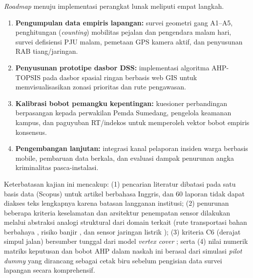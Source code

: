 \documentclass[10pt,twocolumn,a4paper]{article}
\begin{document}
\textit{Roadmap} menuju implementasi perangkat lunak meliputi empat langkah.
\begin{enumerate}[label=\arabic*)]
\item \textbf{Pengumpulan data empiris lapangan:} survei geometri gang A1--A5, penghitungan (\textit{counting}) mobilitas pejalan dan pengendara malam hari, survei defisiensi PJU malam, pemetaan GPS kamera aktif, dan penyusunan RAB tiang/jaringan.
\item \textbf{Penyusunan prototipe dasbor DSS:} implementasi algoritma AHP-TOPSIS pada dasbor spasial ringan berbasis web GIS untuk memvisualisasikan zonasi prioritas dan rute pengawasan.
\item \textbf{Kalibrasi bobot pemangku kepentingan:} kuesioner perbandingan berpasangan kepada perwakilan Pemda Sumedang, pengelola keamanan kampus, dan paguyuban RT/indekos untuk memperoleh vektor bobot empiris konsensus.
\item \textbf{Pengembangan lanjutan:} integrasi kanal pelaporan insiden warga berbasis mobile, pembaruan data berkala, dan evaluasi dampak penurunan angka kriminalitas pasca-instalasi.
\end{enumerate}

Keterbatasan kajian ini mencakup: (1) pencarian literatur dibatasi pada satu basis data (Scopus) untuk artikel berbahasa Inggris, dan 60 laporan tidak dapat diakses teks lengkapnya karena batasan langganan institusi; (2) penurunan beberapa kriteria keselamatan dan arsitektur penempatan sensor dilakukan melalui abstraksi analogi struktural dari domain terkait (rute transportasi bahan berbahaya \cite{kanj}, risiko banjir \cite{zheng}, dan sensor jaringan listrik \cite{yuhang}); (3) kriteria C6 (derajat simpul jalan) bersumber tunggal dari model \textit{vertex cover} \cite{wang}; serta (4) nilai numerik matriks keputusan dan bobot AHP dalam naskah ini berasal dari simulasi \textit{pilot dummy} yang dirancang sebagai cetak biru sebelum pengisian data survei lapangan secara komprehensif.

\balance
\end{document}
